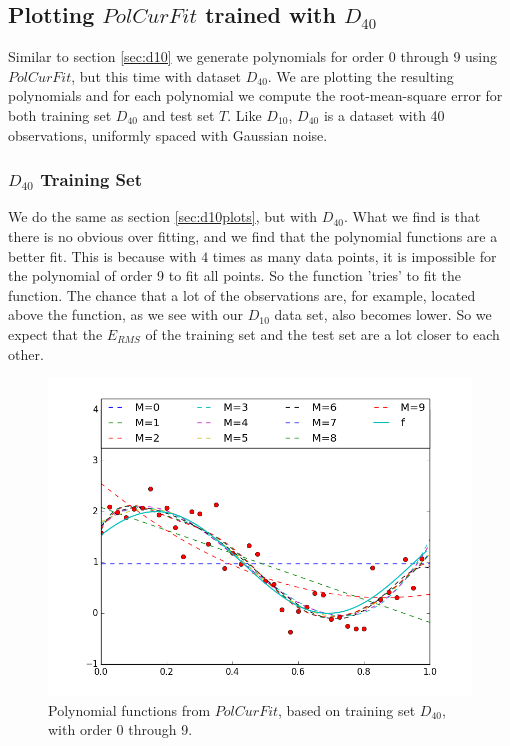\documentclass[11pt]{article}
\begin{document}
\subsection{Plotting $PolCurFit$ trained with $D_{40}$}
Similar to section \ref{sec:d10} we generate polynomials for order 0 through 9 using $PolCurFit$, but this time with dataset $D_{40}$. We are plotting the resulting polynomials and for each polynomial we compute the root-mean-square error for both training set $D_{40}$ and test set $T$. 
 Like $D_{10}$, $D_{40}$ is a dataset with 40 observations, uniformly spaced with Gaussian noise.

\subsubsection{$D_{40}$ Training Set}
We do the same as section \ref{sec:d10plots}, but with $D_{40}$. What we find is that there is no obvious over fitting, and we find that the polynomial functions are a better fit. This is because with $4$ times as many data points, it is impossible for the polynomial of order 9 to fit all points. So the function 'tries' to fit the function. The chance that a lot of the observations are, for example, located above the function, as we see with our $D_{10}$ data set, also becomes lower. So we expect that the $E_{RMS}$ of the training set and the test set are a lot closer to each other.

\begin{figure}[H]
	\centering
		\includegraphics[trim={1cm 1cm 0.5cm 0.7cm},clip, scale=0.5]{images/exercise1_4a.png}
		\caption{Polynomial functions from $PolCurFit$, based on training set $D_{40}$, with order 0 through 9. }
	\label{fig:d40plots}
\end{figure}
\end{document}
